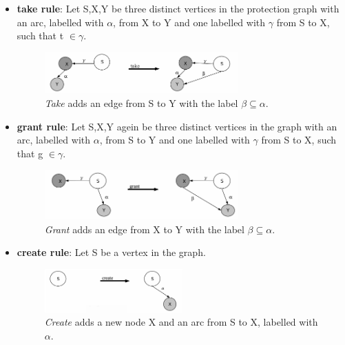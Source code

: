 \documentclass[pdftex,11pt,a4paper]{article}
\begin{document}
	\begin{itemize}
	\item \textbf{take rule}: Let S,X,Y be three distinct vertices in the protection graph with an arc, labelled with $\alpha$, from X to Y and one labelled with $\gamma$ from S to X, such that t $\in \gamma.$  
	\begin{figure}[ht]
	\centering
		\includegraphics[width=0.7\textwidth]{./Pictures/takeRule.png}
	\caption[take rule]{\textit{Take} adds an edge from S to Y with the label $\beta \subseteq \alpha$. \cite{TakeG}}
	\label{fig:cltake}
	\end{figure}		
	
	\item \textbf{grant rule}:	Let S,X,Y agein be three distinct vertices in the graph with an arc, labelled with  $\alpha$, from S to Y and one labelled with $\gamma$ from S to X, such that g $\in \gamma$. 
	\begin{figure}[ht]
	\centering
		\includegraphics[width=0.7\textwidth]{./Pictures/grantRule.png}
	\caption[grant rule]{\textit{Grant} adds an edge from X to Y with the label $\beta \subseteq \alpha$.  \cite{TakeG}}
	\label{fig:clgrant}
	\end{figure}		
	
	\item \textbf{create rule}: Let S be a vertex in the graph. 
	\begin{figure}[H]
	\centering
		\includegraphics[width=0.5\textwidth]{./Pictures/createRule.png}
	\caption[create rule]{\textit{Create} adds a new node X and an arc from S to X, labelled with $\alpha$. \cite{TakeG}}
	\label{fig:clcreate}
	\end{figure}	
	

\end{itemize}
\end{document}
